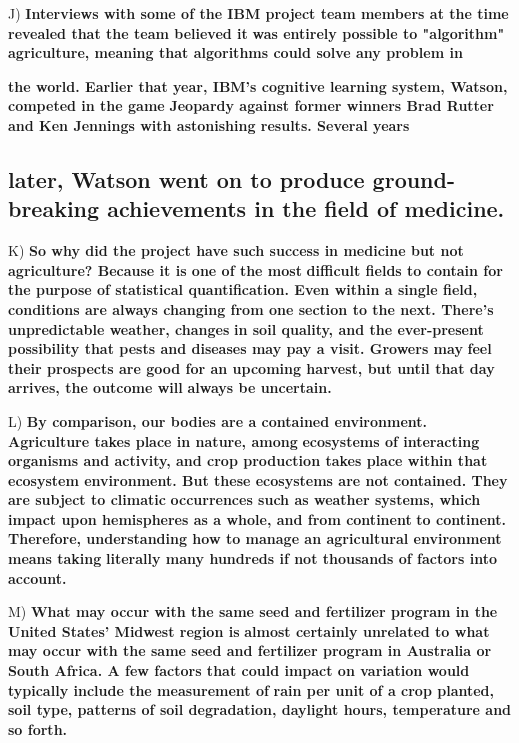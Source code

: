 \documentclass[UTF8,11pt]{ctexart}
\begin{document}
J) \textbf{Interviews with some of the IBM project team members at the time revealed that the team believed it} \textbf{was entirely possible to "algorithm" agriculture, meaning that algorithms could solve any problem in}


\textbf{the world. Earlier that year, IBM's cognitive learning system, Watson, competed in the game} \textbf{Jeopardy against former winners Brad Rutter and Ken Jennings with astonishing results. Several years}


\subsection*{\textbf{later, Watson went on to produce ground-breaking achievements in the field of medicine.}}


K) \textbf{So why did the project have such success in medicine but not agriculture? Because it is one of the most} \textbf{difficult fields to contain for the purpose of statistical quantification. Even within a single field,} \textbf{conditions are always changing from one section to the next. There's unpredictable weather, changes} \textbf{in soil quality, and the ever-present possibility that pests and diseases may pay a visit. Growers may} \textbf{feel their prospects are good for an upcoming harvest, but until that day arrives, the outcome will} \textbf{always be uncertain.}


L) \textbf{By comparison, our bodies are a contained environment. Agriculture takes place in nature, among} \textbf{ecosystems of interacting organisms and activity, and crop production takes place within that} \textbf{ecosystem environment. But these ecosystems are not contained. They are subject to climatic} \textbf{occurrences such as weather systems, which impact upon hemispheres as a whole, and from continent} \textbf{to continent. Therefore, understanding how to manage an agricultural environment means taking} \textbf{literally many hundreds if not thousands of factors into account.}


M) \textbf{What may occur with the same seed and fertilizer program in the United States' Midwest region is} \textbf{almost certainly unrelated to what may occur with the same seed and fertilizer program in Australia or} \textbf{South Africa. A few factors that could impact on variation would typically include the measurement of} \textbf{rain per unit of a crop planted, soil type, patterns of soil degradation, daylight hours, temperature and} \textbf{so forth.}
\end{document}

